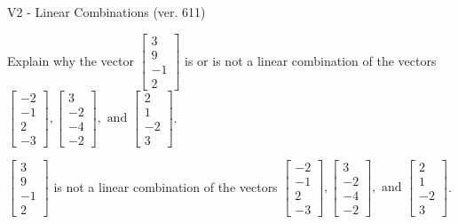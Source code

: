 \begin{exercise}
  \begin{exerciseTitle}V2 - Linear Combinations (ver. 611)\end{exerciseTitle}
  \begin{exerciseStatement}
    Explain why the vector \(\left[\begin{array}{c}
3 \\
9 \\
-1 \\
2
\end{array}\right]\)  is or is not a linear 
	combination of the vectors \(\left[\begin{array}{c}
-2 \\
-1 \\
2 \\
-3
\end{array}\right] , \left[\begin{array}{c}
3 \\
-2 \\
-4 \\
-2
\end{array}\right] , \text{ and } \left[\begin{array}{c}
2 \\
1 \\
-2 \\
3
\end{array}\right]\).
	


  \end{exerciseStatement}
  \begin{exerciseAnswer}
   \(\left[\begin{array}{c}
3 \\
9 \\
-1 \\
2
\end{array}\right]\) 
  	 is not  
	a linear combination of the vectors \(\left[\begin{array}{c}
-2 \\
-1 \\
2 \\
-3
\end{array}\right] , \left[\begin{array}{c}
3 \\
-2 \\
-4 \\
-2
\end{array}\right] , \text{ and } \left[\begin{array}{c}
2 \\
1 \\
-2 \\
3
\end{array}\right]\).

	
  


  \end{exerciseAnswer}
\end{exercise}